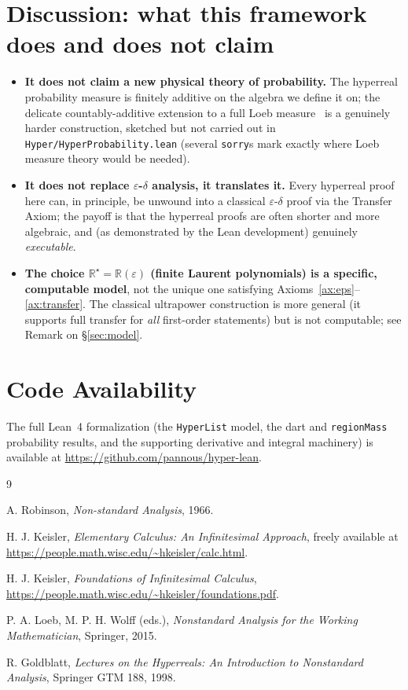 \documentclass[11pt]{article}
\theoremstyle{definition}
\theoremstyle{remark}
\newcommand{\R}{\mathbb{R}}
\newcommand{\Rstar}{\mathbb{R}^{\star}}
\newcommand{\eps}{\varepsilon}
\begin{document}
\section{Discussion: what this framework does and does not claim}

\begin{itemize}
\item \textbf{It does not claim a new physical theory of probability.}
The hyperreal probability measure is finitely additive on the algebra we
define it on; the delicate countably-additive extension to a full Loeb
measure~\cite{loeb} is a genuinely harder construction, sketched but not
carried out in \texttt{Hyper/HyperProbability.lean} (several \texttt{sorry}s
mark exactly where Loeb measure theory would be needed).
\item \textbf{It does not replace $\eps$-$\delta$ analysis, it
translates it.} Every hyperreal proof here can, in principle, be unwound
into a classical $\eps$-$\delta$ proof via the Transfer Axiom; the payoff
is that the hyperreal proofs are often shorter and more algebraic, and (as
demonstrated by the Lean development) genuinely \emph{executable}.
\item \textbf{The choice $\Rstar=\R(\eps)$ (finite Laurent polynomials) is
a specific, computable model}, not the unique one satisfying
Axioms~\ref{ax:eps}--\ref{ax:transfer}. The classical ultrapower
construction is more general (it supports full transfer for
\emph{all} first-order statements) but is not computable; see
Remark on \S\ref{sec:model}.
\end{itemize}

\section*{Code Availability}
The full Lean~4 formalization (the \texttt{HyperList} model, the dart and
\texttt{regionMass} probability results, and the supporting derivative and
integral machinery) is available at
\url{https://github.com/pannous/hyper-lean}.

\begin{thebibliography}{9}

 A. Robinson, \emph{Non-standard Analysis}, 1966.

 H. J. Keisler, \emph{Elementary Calculus: An
Infinitesimal Approach}, freely available at
\url{https://people.math.wisc.edu/~hkeisler/calc.html}.

 H. J. Keisler, \emph{Foundations of Infinitesimal
Calculus}, \url{https://people.math.wisc.edu/~hkeisler/foundations.pdf}.

 P. A. Loeb, M. P. H. Wolff (eds.), \emph{Nonstandard
Analysis for the Working Mathematician}, Springer, 2015.

 R. Goldblatt, \emph{Lectures on the Hyperreals: An
Introduction to Nonstandard Analysis}, Springer GTM 188, 1998.

\end{thebibliography}
\end{document}
